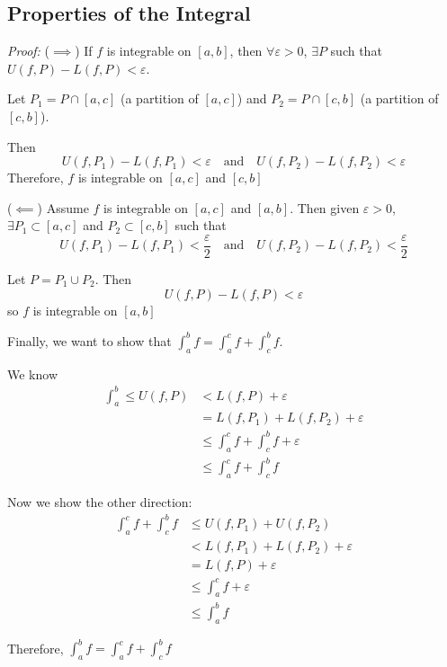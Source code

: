 \documentclass[12pt]{report}
\newcommand{\R}{\mathbb{R}}
\newcommand{\ep}{\varepsilon}
\newenvironment*{tbox}[2][gray]{
    \begin{tcolorbox}[
        parbox=false,
        colback=#1!5!white,
        colframe=#1!75!black,
        breakable,
        title={#2}
    ]}
    {\end{tcolorbox}}
\begin{document}
    \subsection*{Properties of the Integral} 
        \begin{tbox}{\textbf{Theorem:} Assume $f: [a, b] \to \R$ is bounded and let $c \in (a, b)$. Then, $f$ is integrable on $[a, b]$ iff $f$ is integrable on $[a, c]$ and $[c, b]$. In that case, we may write 
            \[\int_a^b f = \int_a^c f + \int_c^b f\]}
            \emph{Proof:} ($\implies$) If $f$ is integrable on $[a, b]$, then $\forall \ep > 0$, $\exists P$ such that $U(f, P) - L(f, P) < \ep$.

            Let $P_1 = P \cap [a, c]$ (a partition of $[a, c]$) and $P_2 = P \cap [c, b]$ (a partition of $[c, b]$). 

            Then 
            \[U(f, P_1) - L(f, P_1) < \ep \quad \text{and} \quad U(f, P_2) - L(f, P_2) < \ep \]
            Therefore, $f$ is integrable on $[a, c]$ and $[c, b]$ 

            ($\impliedby$) Assume $f$ is integrable on $[a, c]$ and $[a, b]$. Then given $\ep > 0$, $\exists P_1 \subset [a, c]$ and $P_2 \subset [c, b]$ such that 
            \[U(f, P_1) - L(f, P_1) < \frac{\ep}{2} \quad \text{and} \quad U(f, P_2) - L(f, P_2) < \frac{\ep}{2} \]

            Let $P = P_1 \cup P_2$. Then
            \[U(f, P) - L(f, P) < \ep\] 
            so $f$ is integrable on $[a, b]$
            
            Finally, we want to show that $\int_a^b f = \int_a^c f + \int_c^b f$.

            We know 
            \begin{align*}
                \int_a^b \leq U(f, P) &< L(f, P) + \ep\\ 
                &= L(f, P_1) + L(f, P_2) + \ep\\ 
                &\leq \int_a^c f + \int_c^b f + \ep\\ 
                &\leq \int_a^c f + \int_c^b f
            \end{align*}
            
            Now we show the other direction: 
            \begin{align*}
                \int_a^c f + \int_c^b f &\leq U(f, P_1) + U(f, P_2)\\
                    &< L(f, P_1) + L(f, P_2) + \ep\\ 
                    &= L(f, P) + \ep\\ 
                    &\leq \int_a^c f + \ep\\ 
                    &\leq \int_a^b f
            \end{align*}

            Therefore, $\int_a^b f = \int_a^c f + \int_c^b f$
        \end{tbox}
\end{document}
